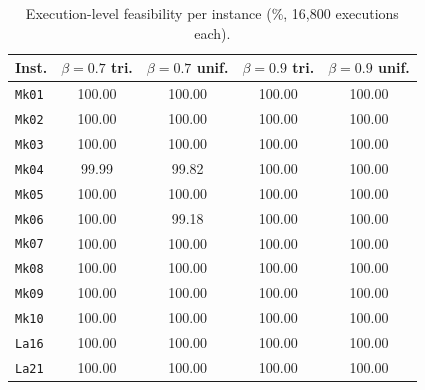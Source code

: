 \begin{table}[htbp]
\centering
\caption{Execution-level feasibility per instance (\%, 16{,}800 executions each).}
\label{tab:credinst}
\footnotesize
\setlength{\tabcolsep}{4pt}
\begin{tabular}{lcccc}
\toprule
Inst. & $\beta{=}0.7$ tri. & $\beta{=}0.7$ unif. & $\beta{=}0.9$ tri. & $\beta{=}0.9$ unif. \\
\midrule
\texttt{Mk01} & 100.00 & 100.00 & 100.00 & 100.00 \\
\texttt{Mk02} & 100.00 & 100.00 & 100.00 & 100.00 \\
\texttt{Mk03} & 100.00 & 100.00 & 100.00 & 100.00 \\
\texttt{Mk04} & 99.99 & 99.82 & 100.00 & 100.00 \\
\texttt{Mk05} & 100.00 & 100.00 & 100.00 & 100.00 \\
\texttt{Mk06} & 100.00 & 99.18 & 100.00 & 100.00 \\
\texttt{Mk07} & 100.00 & 100.00 & 100.00 & 100.00 \\
\texttt{Mk08} & 100.00 & 100.00 & 100.00 & 100.00 \\
\texttt{Mk09} & 100.00 & 100.00 & 100.00 & 100.00 \\
\texttt{Mk10} & 100.00 & 100.00 & 100.00 & 100.00 \\
\texttt{La16} & 100.00 & 100.00 & 100.00 & 100.00 \\
\texttt{La21} & 100.00 & 100.00 & 100.00 & 100.00 \\
\bottomrule
\end{tabular}
\end{table}

